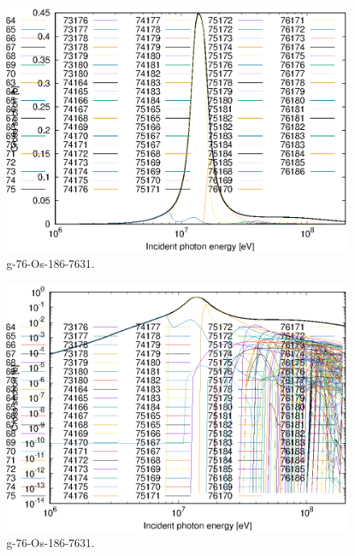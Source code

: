 \begin{figure}
 \includegraphics[width=\linewidth]{eps/g_76-Os-186_7631.eps}
  \caption{g-76-Os-186-7631.}
\end{figure}
\begin{figure}
 \includegraphics[width=\linewidth]{eps-log/g_76-Os-186_7631.eps}
 \caption{g-76-Os-186-7631.}
\end{figure}
\newpage \clearpage

